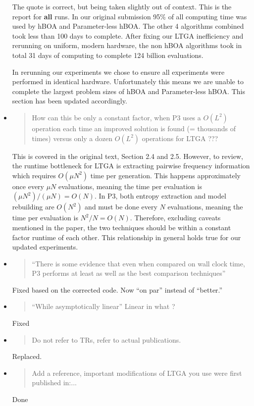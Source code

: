 \documentclass[]{article}
\begin{document}
\begin{itemize}
The quote is correct, but being taken slightly out of context. This is the report for \textbf{all} runs. In our original submission 95\% of all computing time was used by hBOA and Parameter-less hBOA. The other 4 algorithms combined took less than 100 days to complete. After fixing our LTGA inefficiency and rerunning on uniform, modern hardware, the non hBOA algorithms took in total 31 days of computing to complete 124 billion evaluations.

In rerunning our experiments we chose to ensure all experiments were performed in identical hardware. Unfortunately this means we are unable
to complete the largest problem sizes of hBOA and Parameter-less hBOA. This section has been updated accordingly.

\item
\begin{quote}
How can this be only a constant factor, when P3 uses a $O(L^2)$ operation each time an improved solution is found (= thousands of times) versus only a dozen $O(L^2)$ operations for LTGA ???
\end{quote}

This is covered in the original text, Section 2.4 and 2.5. However, to review,
the runtime bottleneck for LTGA is extracting pairwise frequency information which
requires $O(\mu N^2)$ time per generation. This happens approximately once every $\mu N$ evaluations,
meaning the time per evaluation is $(\mu N^2) / (\mu N) = O(N)$.
In P3, both entropy extraction and model rebuilding are $O(N^2)$ and must be done every $N$ evaluations,
meaning the time per evaluation is $N^2 / N = O(N)$. Therefore, excluding caveats mentioned in the paper,
the two techniques should be within a constant factor runtime of each other.
This relationship in general holds true for our updated experiments.


\item
\begin{quote}
``There is some evidence that even when compared on wall clock time, P3 performs at least as well as the best comparison techniques''
\end{quote}

Fixed based on the corrected code. Now ``on par'' instead of ``better.''

\item
\begin{quote}
``While asymptotically linear''   Linear in what ?
\end{quote}

Fixed

\item
\begin{quote}
 Do not refer to TRs, refer to actual publications.
\end{quote}

Replaced.

\item
\begin{quote}
Add a reference, important modifications of LTGA you use were first published in:...
\end{quote}

Done
\end{itemize}
\end{document}
